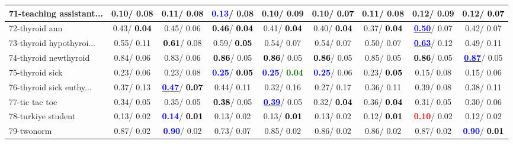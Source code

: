 \begin{table}[h]
\begin{center}
\begin{tabular}{lc|c|c|c|c|c|c|c}
71-teaching assistant... &   0.10/  0.08 &   0.11/  0.08 & \textcolor{blue}{\textbf{  0.13}}/  0.08 &   0.10/  0.09 &   0.10/\textcolor{black}{\textbf{  0.07}} &   0.11/  0.08 &   0.12/  0.09 &   0.12/\textcolor{black}{\textbf{  0.07}} \\ \hline
72-thyroid ann &   0.43/\textcolor{black}{\textbf{  0.04}} &   0.45/  0.06 & \textcolor{black}{\textbf{  0.46}}/\textcolor{black}{\textbf{  0.04}} &   0.41/\textcolor{black}{\textbf{  0.04}} &   0.40/\textcolor{black}{\textbf{  0.04}} &   0.37/\textcolor{black}{\textbf{  0.04}} & \underline{\textcolor{blue}{\textbf{  0.50}}}/  0.07 &   0.42/  0.07 \\
73-thyroid hypothyroi... &   0.55/  0.11 & \textcolor{black}{\textbf{  0.61}}/  0.08 &   0.59/\textcolor{black}{\textbf{  0.05}} &   0.54/  0.07 &   0.54/  0.07 &   0.50/  0.07 & \underline{\textcolor{blue}{\textbf{  0.63}}}/  0.12 &   0.49/  0.11 \\
74-thyroid newthyroid &   0.84/  0.06 &   0.83/  0.06 & \textcolor{black}{\textbf{  0.86}}/  0.05 & \textcolor{black}{\textbf{  0.86}}/  0.05 & \textcolor{black}{\textbf{  0.86}}/  0.05 &   0.85/  0.05 & \textcolor{black}{\textbf{  0.86}}/  0.05 & \underline{\textcolor{blue}{\textbf{  0.87}}}/  0.05 \\
75-thyroid sick &   0.23/  0.06 &   0.23/  0.08 & \textcolor{blue}{\textbf{  0.25}}/\textcolor{black}{\textbf{  0.05}} & \textcolor{blue}{\textbf{  0.25}}/\textcolor{darkgreen}{\textbf{  0.04}} & \textcolor{blue}{\textbf{  0.25}}/  0.06 &   0.23/\textcolor{black}{\textbf{  0.05}} &   0.15/  0.08 &   0.15/  0.06 \\
76-thyroid sick euthy... &   0.37/  0.13 & \underline{\textcolor{blue}{\textbf{  0.47}}}/\textcolor{black}{\textbf{  0.07}} &   0.44/  0.11 &   0.32/  0.16 &   0.27/  0.17 &   0.36/  0.11 &   0.39/  0.08 &   0.38/  0.11 \\
77-tic tac toe &   0.34/  0.05 &   0.35/  0.05 & \textcolor{black}{\textbf{  0.38}}/  0.05 & \underline{\textcolor{blue}{\textbf{  0.39}}}/  0.05 &   0.32/\textcolor{black}{\textbf{  0.04}} &   0.36/\textcolor{black}{\textbf{  0.04}} &   0.31/  0.05 &   0.30/  0.06 \\
78-turkiye student &   0.13/  0.02 & \textcolor{blue}{\textbf{  0.14}}/\textcolor{black}{\textbf{  0.01}} &   0.13/  0.02 &   0.13/\textcolor{black}{\textbf{  0.01}} &   0.13/  0.02 &   0.12/\textcolor{black}{\textbf{  0.01}} & \textcolor{red}{\textbf{  0.10}}/  0.02 &   0.12/  0.02 \\ \hline
79-twonorm &   0.87/  0.02 & \textcolor{blue}{\textbf{  0.90}}/  0.02 &   0.73/  0.07 &   0.85/  0.02 &   0.86/  0.02 &   0.86/  0.02 &   0.87/  0.02 & \textcolor{blue}{\textbf{  0.90}}/\textcolor{black}{\textbf{  0.01}} \\

\end{tabular}
\end{center}
\end{table}
